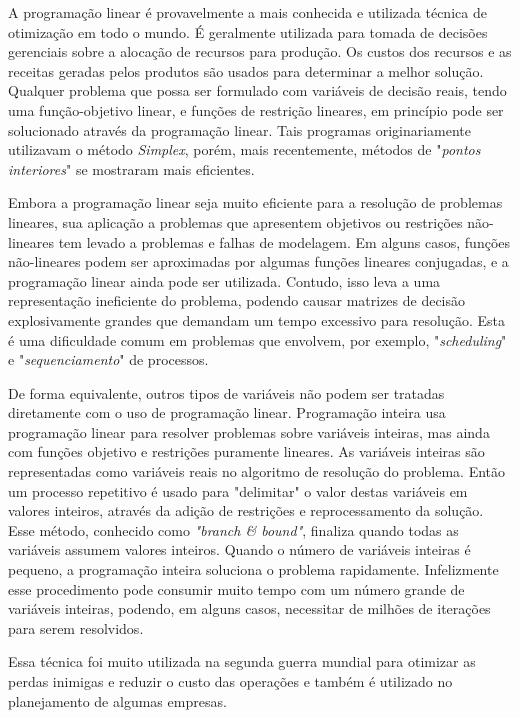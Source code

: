 A programação linear é provavelmente a mais conhecida e utilizada técnica de otimização em todo o mundo. É geralmente utilizada para tomada de decisões gerenciais sobre a alocação de recursos para produção. Os custos dos recursos e as receitas geradas pelos produtos são usados para determinar a melhor solução. Qualquer problema que possa ser formulado com variáveis de decisão reais, tendo uma função-objetivo linear, e funções de restrição lineares, em princípio pode ser solucionado através da programação linear. Tais programas originariamente utilizavam o método \textit{Simplex}, porém, mais recentemente, métodos de "\textit{pontos interiores}" se mostraram mais eficientes.

Embora a programação linear seja muito eficiente para a resolução de problemas lineares, sua aplicação a problemas que apresentem objetivos ou restrições não-lineares tem levado a problemas e falhas de modelagem. Em alguns casos, funções não-lineares podem ser aproximadas por algumas funções lineares conjugadas, e a programação linear ainda pode ser utilizada. Contudo, isso leva a uma representação ineficiente do problema, podendo causar matrizes de decisão explosivamente grandes que demandam um tempo excessivo para resolução. Esta é uma dificuldade comum em problemas que envolvem, por exemplo, "\textit{scheduling}" e "\textit{sequenciamento}" de processos.

De forma equivalente, outros tipos de variáveis não podem ser tratadas diretamente com o uso de programação linear. Programação inteira usa programação linear para resolver problemas sobre variáveis inteiras, mas ainda com funções objetivo e restrições puramente lineares. As variáveis inteiras são representadas como variáveis reais no algoritmo de resolução do problema. Então um processo repetitivo é usado para "delimitar" o valor destas variáveis em valores inteiros, através da adição de restrições e reprocessamento da solução. Esse método, conhecido como \textit{"branch \& bound"}, finaliza quando todas as variáveis assumem valores inteiros. Quando o número de variáveis inteiras é pequeno, a programação inteira soluciona o problema rapidamente. Infelizmente esse procedimento pode consumir muito tempo com um número grande de variáveis inteiras, podendo, em alguns casos, necessitar de milhões de iterações para serem resolvidos.
 	
 	Essa técnica foi muito utilizada na segunda guerra mundial para otimizar as perdas inimigas e reduzir o custo das operações e também é utilizado no planejamento de algumas empresas.

